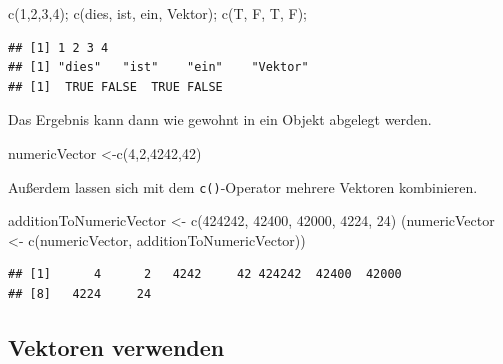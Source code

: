\documentclass[
]{book}
\newenvironment{Shaded}{\begin{snugshade}}{\end{snugshade}}
\newcommand{\DecValTok}[1]{\textcolor[rgb]{0.00,0.00,0.81}{#1}}
\newcommand{\FunctionTok}[1]{\textcolor[rgb]{0.00,0.00,0.00}{#1}}
\newcommand{\NormalTok}[1]{#1}
\newcommand{\OtherTok}[1]{\textcolor[rgb]{0.56,0.35,0.01}{#1}}
\newcommand{\StringTok}[1]{\textcolor[rgb]{0.31,0.60,0.02}{#1}}
\begin{document}
\begin{Shaded}
\begin{Highlighting}[]
\FunctionTok{c}\NormalTok{(}\DecValTok{1}\NormalTok{,}\DecValTok{2}\NormalTok{,}\DecValTok{3}\NormalTok{,}\DecValTok{4}\NormalTok{);}
\FunctionTok{c}\NormalTok{(}\StringTok{\textquotesingle{}dies\textquotesingle{}}\NormalTok{, }\StringTok{\textquotesingle{}ist\textquotesingle{}}\NormalTok{, }\StringTok{\textquotesingle{}ein\textquotesingle{}}\NormalTok{, }\StringTok{\textquotesingle{}Vektor\textquotesingle{}}\NormalTok{);}
\FunctionTok{c}\NormalTok{(T, F, T, F);}
\end{Highlighting}
\end{Shaded}

\begin{verbatim}
## [1] 1 2 3 4
## [1] "dies"   "ist"    "ein"    "Vektor"
## [1]  TRUE FALSE  TRUE FALSE
\end{verbatim}

Das Ergebnis kann dann wie gewohnt in ein Objekt abgelegt werden.

\begin{Shaded}
\begin{Highlighting}[]
\NormalTok{numericVector }\OtherTok{\textless{}{-}}\FunctionTok{c}\NormalTok{(}\DecValTok{4}\NormalTok{,}\DecValTok{2}\NormalTok{,}\DecValTok{4242}\NormalTok{,}\DecValTok{42}\NormalTok{)}
\end{Highlighting}
\end{Shaded}

Außerdem lassen sich mit dem \texttt{c()}-Operator mehrere Vektoren kombinieren.

\begin{Shaded}
\begin{Highlighting}[]
\NormalTok{additionToNumericVector }\OtherTok{\textless{}{-}}  \FunctionTok{c}\NormalTok{(}\DecValTok{424242}\NormalTok{, }\DecValTok{42400}\NormalTok{, }\DecValTok{42000}\NormalTok{,}
                               \DecValTok{4224}\NormalTok{, }\DecValTok{24}\NormalTok{)}
\NormalTok{(numericVector }\OtherTok{\textless{}{-}} \FunctionTok{c}\NormalTok{(numericVector, }
\NormalTok{                    additionToNumericVector))}
\end{Highlighting}
\end{Shaded}

\begin{verbatim}
## [1]      4      2   4242     42 424242  42400  42000
## [8]   4224     24
\end{verbatim}

\hypertarget{vektoren-verwenden}{%
\subsection{Vektoren verwenden}\label{vektoren-verwenden}}
\end{document}
